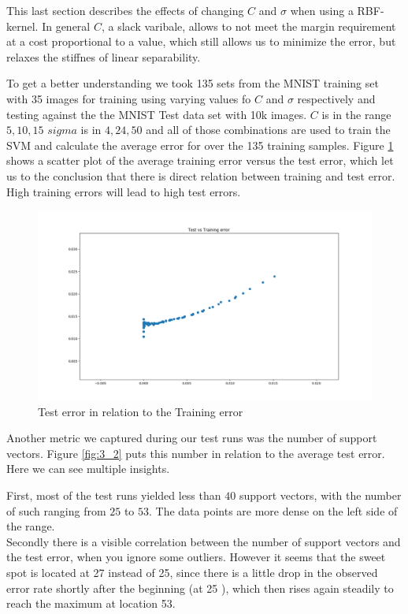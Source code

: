 This last section describes the effects of changing $C$ and $\sigma$ when using a RBF-kernel. In general $C$, a slack varibale, allows to not meet the margin requirement at a cost proportional to a value, which still allows us to minimize the error, but relaxes the stiffnes of linear separability.


To get a better understanding we took 135 sets from the MNIST training set with 35 images for training using varying values fo $C$ and $\sigma$ respectively and testing against the the MNIST Test data set with 10k images. $C$ is in the range ${5, 10, 15}$ $sigma$ is in ${4, 24, 50}$ and all of those combinations are used to train the SVM and calculate the average error for over the 135 training samples. 
Figure \ref{fig:3_1} shows a scatter plot of the average training error versus the  test error, which let us to the conclusion that there is direct  relation between training and test error. High training errors will lead to high test errors.\\

\begin{figure}[!h]
\begin{center}
\centering
\includegraphics[width=1\textwidth]{figures/new/3_Figure_1}
\end{center}
\caption{\label{fig:3_1}  Test error in relation to the Training error  }
\end{figure}


Another metric we captured during our test runs was the number of support vectors. Figure \ref{fig:3_2} puts this number in relation to the average test error.  Here we can see multiple insights. 

First, most of the test runs yielded less than $40$ support vectors, with the number of such ranging from $25$ to $53$. The data points are more dense on the left side of the range.\\
Secondly there is a visible correlation between the number of support vectors and the test error, when you ignore some outliers. However it seems that the sweet spot is located at 27 instead of 25, since there is a little drop in the observed error rate shortly after the beginning (at 25 ), which then rises again steadily to reach the maximum at location 53.


